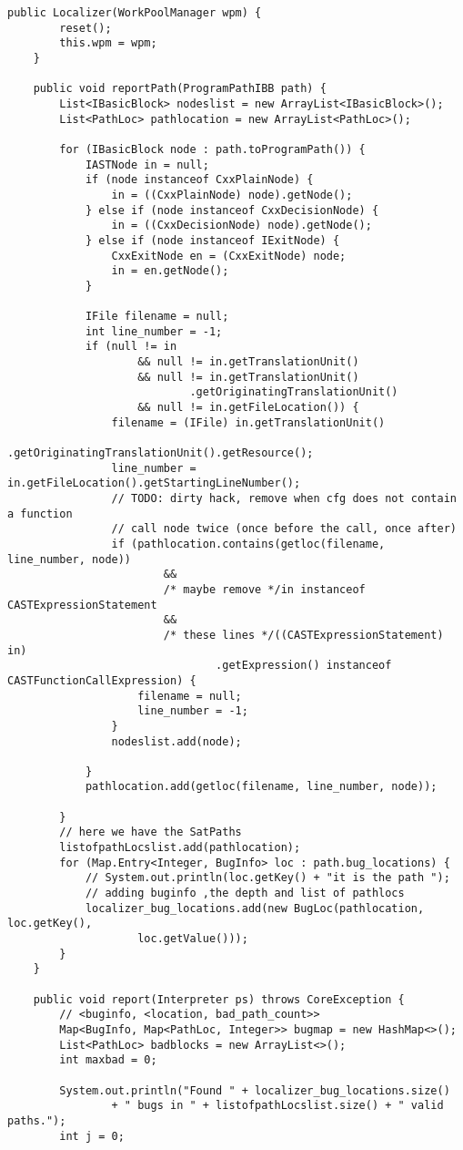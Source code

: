 \begin{lstlisting}[caption={Localizer},label={lst:Localizer}]
	public Localizer(WorkPoolManager wpm) {
		reset();
		this.wpm = wpm;
	}

	public void reportPath(ProgramPathIBB path) {
		List<IBasicBlock> nodeslist = new ArrayList<IBasicBlock>();
		List<PathLoc> pathlocation = new ArrayList<PathLoc>();

		for (IBasicBlock node : path.toProgramPath()) {
			IASTNode in = null;
			if (node instanceof CxxPlainNode) {
				in = ((CxxPlainNode) node).getNode();
			} else if (node instanceof CxxDecisionNode) {
				in = ((CxxDecisionNode) node).getNode();
			} else if (node instanceof IExitNode) {
				CxxExitNode en = (CxxExitNode) node;
				in = en.getNode();
			}

			IFile filename = null;
			int line_number = -1;
			if (null != in
					&& null != in.getTranslationUnit()
					&& null != in.getTranslationUnit()
							.getOriginatingTranslationUnit()
					&& null != in.getFileLocation()) {
				filename = (IFile) in.getTranslationUnit()
						.getOriginatingTranslationUnit().getResource();
				line_number = in.getFileLocation().getStartingLineNumber();
				// TODO: dirty hack, remove when cfg does not contain a function
				// call node twice (once before the call, once after)
				if (pathlocation.contains(getloc(filename, line_number, node))
						&&
						/* maybe remove */in instanceof CASTExpressionStatement
						&&
						/* these lines */((CASTExpressionStatement) in)
								.getExpression() instanceof CASTFunctionCallExpression) {
					filename = null;
					line_number = -1;
				}
				nodeslist.add(node);

			}
			pathlocation.add(getloc(filename, line_number, node));

		}
		// here we have the SatPaths
		listofpathLocslist.add(pathlocation);
		for (Map.Entry<Integer, BugInfo> loc : path.bug_locations) {
			// System.out.println(loc.getKey() + "it is the path ");
			// adding buginfo ,the depth and list of pathlocs
			localizer_bug_locations.add(new BugLoc(pathlocation, loc.getKey(),
					loc.getValue()));
		}
	}

	public void report(Interpreter ps) throws CoreException {
		// <buginfo, <location, bad_path_count>>
		Map<BugInfo, Map<PathLoc, Integer>> bugmap = new HashMap<>();
		List<PathLoc> badblocks = new ArrayList<>();
		int maxbad = 0;

		System.out.println("Found " + localizer_bug_locations.size()
				+ " bugs in " + listofpathLocslist.size() + " valid paths.");
		int j = 0;


\end{lstlisting}
